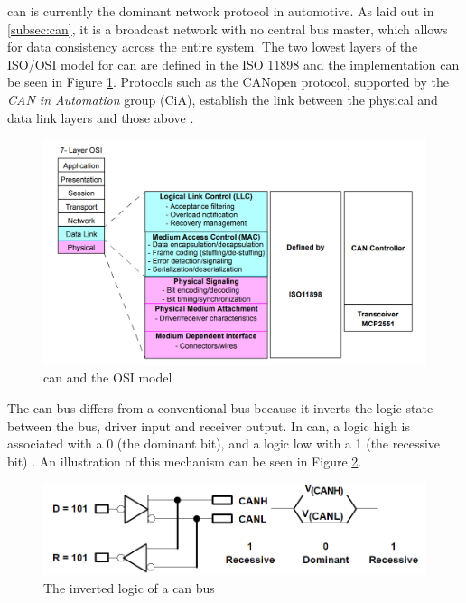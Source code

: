 \gls{can} is currently the dominant network protocol in automotive. As laid out in \ref{subsec:can}, it is a broadcast network with no central bus master, which allows for data consistency across the entire system. The two lowest layers of the ISO/OSI model for \gls{can} are defined in the ISO 11898 \citep{Richards2002} and the implementation can be seen in Figure \ref{fig:CAN_ISO}. Protocols such as the CANopen protocol, supported by the \emph{CAN in Automation} group (CiA), establish the link between the physical and data link layers and those above \citep{Corrigan2002}.

\begin{figure}
    \centering
    \includegraphics[width = \textwidth]{img/parts/introduction/CAN ISO.png}
    \caption{\gls{can} and the OSI model \citep{Richards2002}}
    \label{fig:CAN_ISO}
\end{figure}

The \gls{can} bus differs from a conventional bus because it inverts the logic state between the bus, driver input and receiver output. In \gls{can}, a logic high is associated with a 0 (the dominant bit), and a logic low with a 1 (the recessive bit) \citep{Corrigan2002}. An illustration of this mechanism can be seen in Figure \ref{fig:CAN_Bus_Logic}.

\begin{figure}
    \centering
    \includegraphics[width = \textwidth]{img/parts/introduction/CAN Bus Logic.png}
    \caption{The inverted logic of a \gls{can} bus \citep{Corrigan2002}}
    \label{fig:CAN_Bus_Logic}
\end{figure}

